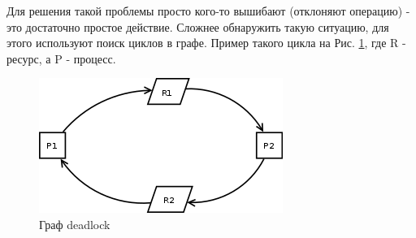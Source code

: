 Для решения такой проблемы просто кого-то вышибают (отклоняют операцию) - это достаточно простое действие. Сложнее обнаружить такую ситуацию, для этого используют поиск циклов в графе. Пример такого цикла на Рис. \ref{fig:dead}, где R - ресурс, а P - процесс. 

\begin{figure}[H]
	\centering
	\includegraphics[scale = 0.5]{6/deadlock.png}
	\caption{Граф deadlock}
	\label{fig:dead}
	
\end{figure}
